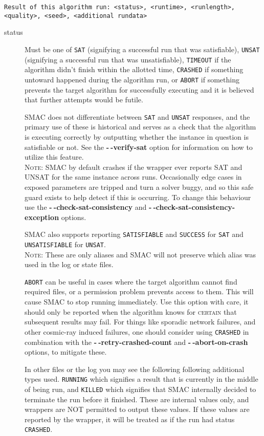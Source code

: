 \documentclass[manual.tex]{subfiles}
\begin{document}
\texttt{Result of this algorithm run: <status>, <runtime>, <runlength>, <quality>, <seed>, <additional rundata>} 
\begin{description}

\item [{status}] Must be one of \texttt{SAT} (signifying a successful run that was satisfiable), \texttt{UNSAT} (signifying a successful run that was unsatisfiable), \texttt{TIMEOUT} if the algorithm didn't finish within the allotted time, \texttt{CRASHED} if something untoward happened during the algorithm run, or \texttt{ABORT} if something prevents the target algorithm for successfully executing and it is believed that further attempts would be futile. 

SMAC does not differentiate between \texttt{SAT} and \texttt{UNSAT} responses, and the primary use of these is historical and serves as a check that the algorithm is executing correctly by outputting whether the instance in question is satisfiable or not. See the \textbf{-$\!~$-verify-sat} option for information on how to utilize this feature. 
\\
\textsc{Note:} SMAC by default crashes if the wrapper ever reports SAT and UNSAT for the same instance across runs. Occasionally edge cases in exposed parameters are tripped and turn a solver buggy, and so this safe guard exists to help detect if this is occurring. To change this behaviour use the \textbf{-$\!~$-check-sat-consistency} and \textbf{-$\!~$-check-sat-consistency-exception} options.

SMAC also supports reporting \texttt{SATISFIABLE} and \texttt{SUCCESS} for \texttt{SAT} and \texttt{UNSATISFIABLE} for \texttt{UNSAT}.
\\ \textsc{Note:} These are only aliases and SMAC will not preserve which alias was used in the log or state files.

\texttt{ABORT} can be useful in
cases where the target algorithm cannot find required files, or a
permission problem prevents access to them. This will cause SMAC to
stop running immediately. Use this option with care, it should only be reported when the algorithm knows for \textsc{certain} that subsequent results may fail. For things like sporadic network failures, and other cosmic-ray induced failures, one should consider using \texttt{CRASHED} in combination with the \textbf{-$\!~$-retry-crashed-count}  and \textbf{-$~\!\!$-abort-on-crash} options, to mitigate these.

In other files or the log you may see the following following additional types used. \texttt{RUNNING} which signifies a result that is currently in the middle of being run, and \texttt{KILLED} which signifies that SMAC internally decided to terminate the run before it finished. These are internal values only, and wrappers are NOT permitted to output these values. If these values are reported by the wrapper, it will be treated as if the run had status \texttt{CRASHED}.


\end{description}
\end{document}
